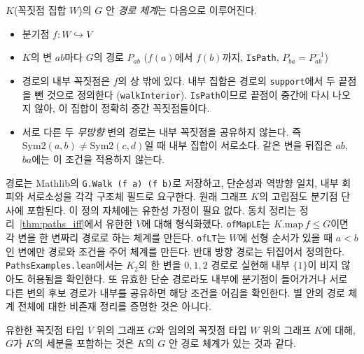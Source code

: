 \begin{definition}[경로 체계]
\label{def:paths}
\leanok
\(K\)(꼭짓점 집합 \(W\))의 \(G\) 안 \emph{경로 체계}는 다음으로 이루어진다.
\begin{itemize}
  \item 분기점 \(f : W \hookrightarrow V\)
  \item \(K\)의 변 \(ab\)마다 \(G\)의 경로 \(P_{ab}\) (\(f(a)\)에서 \(f(b)\)까지, \texttt{IsPath},
        \(P_{ba} = P_{ab}^{-1}\))
  \item 경로의 내부 꼭짓점은 \(f\)의 상 밖에 있다. 내부 집합은 경로의 \texttt{support}에서 두 끝점을
        뺀 것으로 정의한다 (\texttt{walkInterior}). \texttt{IsPath}이므로 끝점이 중간에 다시 나오지 않아,
        이 집합이 정확히 중간 꼭짓점들이다.
  \item 서로 다른 두 \emph{무방향} 변의 경로는 내부 꼭짓점을 공유하지 않는다.
        즉 \(\mathrm{Sym2}(a,b) \ne \mathrm{Sym2}(c,d)\)일 때 내부 집합이 서로소다.
        같은 변을 뒤집은 \(ab\), \(ba\)에는 이 조건을 적용하지 않는다.
\end{itemize}
경로는 Mathlib의 \texttt{G.Walk (f a) (f b)}로 저장하고, 단순성과 역방향 일치, 내부 회피와 서로소성을
각각 구조체 필드로 요구한다. 원래 그래프 \(K\)의 고립점도 분기점 단사에 포함된다.
이 정의 자체에는 유한성 가정이 필요 없다. 동치 정리는 정리~\ref{thm:paths_iff}에서 유한한 \(V\)에 대해
형식화했다.
\texttt{ofMapLE}는 \(K.\mathrm{map}\,f \le G\)이면 각 변을 한 변짜리 경로로 하는 체계를 만든다.
\texttt{ofLT}는 \(W\)에 선형 순서가 있을 때 \(a<b\)인 변에만 경로와 조건을 주어 체계를 만든다.
반대 방향 경로는 뒤집어서 정의한다.
\texttt{PathsExamples.lean}에서는 \(K_2\)의 한 변을 \(0,1,2\) 경로로 실현해 내부 \(\{1\}\)이 비지
않아도 허용됨을 확인한다. 또 유효한 단순 경로라도 내부에 분기점이 들어가거나 서로 다른 변의 후보 경로가 내부를 공유하면
해당 조건을 어김을 확인한다. 별 안의 경로 체계 전체에 대한 비존재 정리를 증명한 것은 아니다.
\end{definition}

\begin{theorem}[두 표현은 같다]
\label{thm:paths_iff}
\leanok
유한한 꼭짓점 타입 \(V\) 위의 그래프 \(G\)와 임의의 꼭짓점 타입 \(W\) 위의 그래프 \(K\)에 대해,
\(G\)가 \(K\)의 세분을 포함하는 것은 \(K\)의 \(G\) 안 경로 체계가 있는 것과 같다.
\end{theorem}

